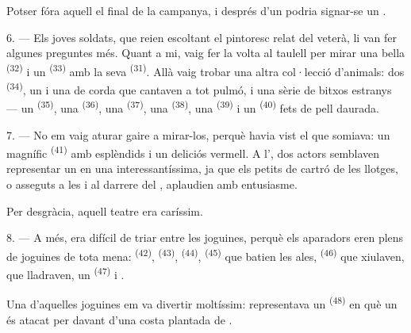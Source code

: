Potser fóra aquell el final de la campanya, i després d'un  podria signar-se
un .

\VUsaut{4.4mm}
\VUsaut{2.8mm}

6. --- Els joves soldats, que reien escoltant el pintoresc relat del veterà, li van fer
algunes preguntes més. Quant a mi, vaig fer la volta al taulell per mirar una bella
 \textsuperscript{(32)} i un  \textsuperscript{(33)} amb la seva
 \textsuperscript{(31)}. Allà vaig trobar una altra col·lecció d'animals: dos
 \textsuperscript{(34)}, un  i una 
de corda que cantaven a tot pulmó, i una sèrie de bitxos estranys --- un 
\textsuperscript{(35)}, una  \textsuperscript{(36)}, una
 \textsuperscript{(37)}, una  \textsuperscript{(38)},
una  \textsuperscript{(39)} i un  \textsuperscript{(40)} fets de
pell daurada.

7. --- No em vaig aturar gaire a mirar-los, perquè havia vist el que somiava: un magnífic
 \textsuperscript{(41)} amb esplèndids
 i un deliciós  vermell. A l', dos
actors semblaven representar un  en una  interessantíssima, ja que
els petits  de cartró de les llotges, o asseguts a les  i
al  darrere del
, aplaudien amb entusiasme.

Per desgràcia, aquell teatre era caríssim.

8. --- A més, era difícil de triar entre les joguines, perquè els aparadors eren plens de
joguines de tota mena:  \textsuperscript{(42)},
 \textsuperscript{(43)}, 
\textsuperscript{(44)},  \textsuperscript{(45)} que batien les ales,
 \textsuperscript{(46)} que xiulaven,  que
lladraven, un  \textsuperscript{(47)} i .


Una d'aquelles joguines em va divertir moltíssim: representava un 
\textsuperscript{(48)} en què un  és atacat per
 davant d'una costa plantada de .


